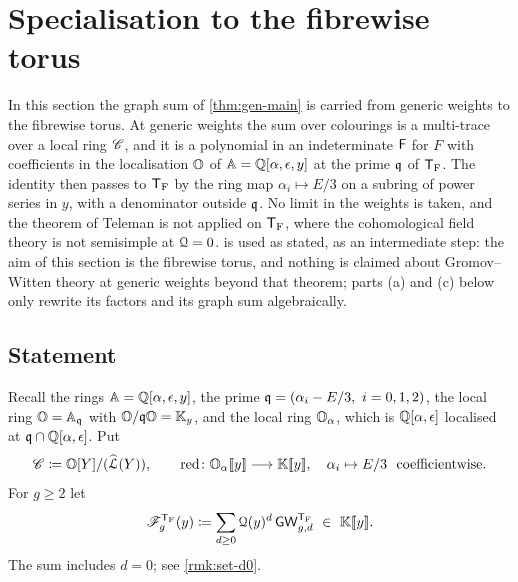 \newcommand{\speLbar}{\overline{\Lhat}}          %
\newcommand{\speWbar}{\overline{W}}              %
\newcommand{\speYbar}{\overline{Y}}              %
\newcommand{\speEtab}{\overline{\eta}}           %
\newcommand{\speSW}{S_{\mathrm{W}}}              %
\newcommand{\speNij}{\mathsf{N}_{ij}}            %
\newcommand{\spechart}{\mathsf{a}}               %
\section{Specialisation to the fibrewise torus}
\label{sec:spe}

In this section the graph sum of \cref{thm:gen-main} is carried from generic weights to the fibrewise torus. At generic weights the sum over colourings is a multi-trace over a local ring $\mathscr{C}$, and it is a polynomial in an indeterminate $\mathsf{F}$ for $F$ with coefficients in the localisation $\mathbb{O}$ of $\mathbb{A}=\mathbb{Q}[\alpha,\epsilon,y]$ at the prime $\mathfrak{q}$ of $\mathsf{T}_{\mathrm{F}}$. The identity then passes to $\mathsf{T}_{\mathrm{F}}$ by the ring map $\alpha_i\mapsto E/3$ on a subring of power series in $y$, with a denominator outside $\mathfrak{q}$. No limit in the weights is taken, and the theorem of Teleman is not applied on $\mathsf{T}_{\mathrm{F}}$, where the cohomological field theory is not semisimple at $\mathcal{Q}=0$.  is used as stated, as an intermediate step: the aim of this section is the fibrewise torus, and nothing is claimed about Gromov--Witten theory at generic weights beyond that theorem; parts (a) and (c) below only rewrite its factors and its graph sum algebraically.

\subsection{Statement}
\label{sec:spe-statement}

Recall the rings $\mathbb{A}=\mathbb{Q}[\alpha,\epsilon,y]$, the prime $\mathfrak{q}=(\alpha_i-E/3,\ i=0,1,2)$, the local ring $\mathbb{O}=\mathbb{A}_{\mathfrak{q}}$ with $\mathbb{O}/\mathfrak{q}\mathbb{O}=\mathbb{K}_{y}$, and the local ring $\mathbb{O}_{\alpha}$, which is $\mathbb{Q}[\alpha,\epsilon]$ localised at $\mathfrak{q}\cap\mathbb{Q}[\alpha,\epsilon]$. Put
\[
\mathscr{C}\coloneqq\mathbb{O}[Y]/(\widehat{\mathcal{L}}(Y)),\qquad \mathrm{red}\colon\mathbb{O}_{\alpha}[\![ y ]\!]\longrightarrow\mathbb{K}[\![ y ]\!],\quad \alpha_i\mapsto E/3\ \text{ coefficientwise}.
\]
For $g\geq 2$ let
\[
\mathscr{F}_g^{\mathsf{T}_{\mathrm{F}}}(y)\coloneqq\sum_{d\geq 0}\mathcal{Q}(y)^d\,\mathsf{GW}_{g,d}^{\mathsf{T}_{\mathrm{F}}}\ \in\ \mathbb{K}[\![ y ]\!].
\]
The sum includes $d=0$; see \cref{rmk:set-d0}.

